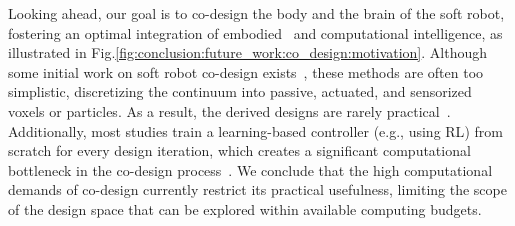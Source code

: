 Looking ahead, our goal is to co-design the body and the brain of the soft robot, fostering an optimal integration of embodied~\citep{mengaldo2022concise} and computational intelligence, as illustrated in Fig.\ref{fig:conclusion:future_work:co_design:motivation}. Although some initial work on soft robot co-design exists~\citep{spielberg2019learning, bhatia2021evolution, van2022co, wang2022curriculum, wang2023preco, wang2024diffusebot}, these methods are often too simplistic, discretizing the continuum into passive, actuated, and sensorized voxels or particles. As a result, the derived designs are rarely practical~\citep{legrand2023reconfigurable, wang2024diffusebot}. Additionally, most studies train a learning-based controller (e.g., using \gls{RL}) from scratch for every design iteration, which creates a significant computational bottleneck in the co-design process~\citep{bhatia2021evolution, wang2022curriculum, wang2023preco}. We conclude that the high computational demands of co-design currently restrict its practical usefulness, limiting the scope of the design space that can be explored within available computing budgets.


